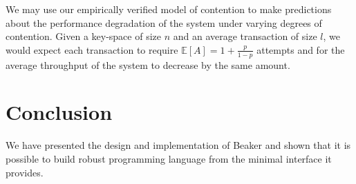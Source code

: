 \documentclass[../main.tex]{subfiles}
\begin{document}
  We may use our empirically verified model of contention to make predictions about the performance
  degradation of the system under varying degrees of contention. Given a key-space of size $n$ and
  an average transaction of size $l$, we would expect each transaction to require
  $\mathbb{E}[A] = 1 + \frac{p}{1 - p}$ attempts and for the average throughput of the system to
  decrease by the same amount.

\section{Conclusion}
We have presented the design and implementation of Beaker and shown that it is possible to build
robust programming language from the minimal interface it provides.
\end{document}
